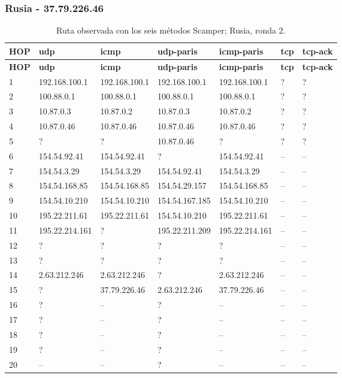 \subsubsection{Rusia - 37.79.226.46}
\begingroup
\fontsize{8}{10}\selectfont
\begin{longtable}{p{0.8cm}p{2.25cm}p{2.25cm}p{2.25cm}p{2.25cm}p{2.25cm}p{2.25cm}}
\caption{Ruta observada con los seis métodos Scamper; Rusia, ronda 2.}\label{tabla1:37.79.226.46} \\
\toprule
\textbf{HOP} & \textbf{udp} & \textbf{icmp} & \textbf{udp-paris} & \textbf{icmp-paris} & \textbf{tcp} & \textbf{tcp-ack} \\ \midrule
\endfirsthead
\toprule
\textbf{HOP} & \textbf{udp} & \textbf{icmp} & \textbf{udp-paris} & \textbf{icmp-paris} & \textbf{tcp} & \textbf{tcp-ack} \\ \midrule
\endhead
1 & 192.168.100.1 & 192.168.100.1 & 192.168.100.1 & 192.168.100.1 & ? & ? \\
2 & 100.88.0.1 & 100.88.0.1 & 100.88.0.1 & 100.88.0.1 & ? & ? \\
3 & 10.87.0.3 & 10.87.0.2 & 10.87.0.3 & 10.87.0.2 & ? & ? \\
4 & 10.87.0.46 & 10.87.0.46 & 10.87.0.46 & 10.87.0.46 & ? & ? \\
5 & ? & ? & 10.87.0.46 & ? & ? & ? \\
6 & 154.54.92.41 & 154.54.92.41 & ? & 154.54.92.41 & -- & -- \\
7 & 154.54.3.29 & 154.54.3.29 & 154.54.92.41 & 154.54.3.29 & -- & -- \\
8 & 154.54.168.85 & 154.54.168.85 & 154.54.29.157 & 154.54.168.85 & -- & -- \\
9 & 154.54.10.210 & 154.54.10.210 & 154.54.167.185 & 154.54.10.210 & -- & -- \\
10 & 195.22.211.61 & 195.22.211.61 & 154.54.10.210 & 195.22.211.61 & -- & -- \\
11 & 195.22.214.161 & ? & 195.22.211.209 & 195.22.214.161 & -- & -- \\
12 & ? & ? & ? & ? & -- & -- \\
13 & ? & ? & ? & ? & -- & -- \\
14 & 2.63.212.246 & 2.63.212.246 & ? & 2.63.212.246 & -- & -- \\
15 & ? & 37.79.226.46 & 2.63.212.246 & 37.79.226.46 & -- & -- \\
16 & ? & -- & ? & -- & -- & -- \\
17 & ? & -- & ? & -- & -- & -- \\
18 & ? & -- & ? & -- & -- & -- \\
19 & ? & -- & ? & -- & -- & -- \\
20 & -- & -- & ? & -- & -- & -- \\
\bottomrule
\end{longtable}
\endgroup

